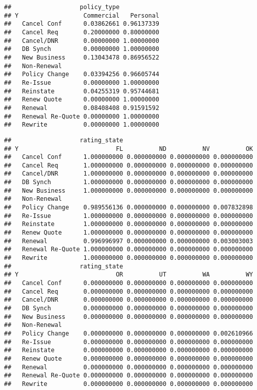 \documentclass[]{article}
\begin{document}
\begin{verbatim}
##                   policy_type
## Y                  Commercial   Personal
##   Cancel Conf      0.03862661 0.96137339
##   Cancel Req       0.20000000 0.80000000
##   Cancel/DNR       0.00000000 1.00000000
##   DB Synch         0.00000000 1.00000000
##   New Business     0.13043478 0.86956522
##   Non-Renewal                           
##   Policy Change    0.03394256 0.96605744
##   Re-Issue         0.00000000 1.00000000
##   Reinstate        0.04255319 0.95744681
##   Renew Quote      0.00000000 1.00000000
##   Renewal          0.08408408 0.91591592
##   Renewal Re-Quote 0.00000000 1.00000000
##   Rewrite          0.00000000 1.00000000
\end{verbatim}

\begin{verbatim}
##                   rating_state
## Y                           FL          ND          NV          OK
##   Cancel Conf      1.000000000 0.000000000 0.000000000 0.000000000
##   Cancel Req       1.000000000 0.000000000 0.000000000 0.000000000
##   Cancel/DNR       1.000000000 0.000000000 0.000000000 0.000000000
##   DB Synch         1.000000000 0.000000000 0.000000000 0.000000000
##   New Business     1.000000000 0.000000000 0.000000000 0.000000000
##   Non-Renewal                                                     
##   Policy Change    0.989556136 0.000000000 0.000000000 0.007832898
##   Re-Issue         1.000000000 0.000000000 0.000000000 0.000000000
##   Reinstate        1.000000000 0.000000000 0.000000000 0.000000000
##   Renew Quote      1.000000000 0.000000000 0.000000000 0.000000000
##   Renewal          0.996996997 0.000000000 0.000000000 0.003003003
##   Renewal Re-Quote 1.000000000 0.000000000 0.000000000 0.000000000
##   Rewrite          1.000000000 0.000000000 0.000000000 0.000000000
##                   rating_state
## Y                           OR          UT          WA          WY
##   Cancel Conf      0.000000000 0.000000000 0.000000000 0.000000000
##   Cancel Req       0.000000000 0.000000000 0.000000000 0.000000000
##   Cancel/DNR       0.000000000 0.000000000 0.000000000 0.000000000
##   DB Synch         0.000000000 0.000000000 0.000000000 0.000000000
##   New Business     0.000000000 0.000000000 0.000000000 0.000000000
##   Non-Renewal                                                     
##   Policy Change    0.000000000 0.000000000 0.000000000 0.002610966
##   Re-Issue         0.000000000 0.000000000 0.000000000 0.000000000
##   Reinstate        0.000000000 0.000000000 0.000000000 0.000000000
##   Renew Quote      0.000000000 0.000000000 0.000000000 0.000000000
##   Renewal          0.000000000 0.000000000 0.000000000 0.000000000
##   Renewal Re-Quote 0.000000000 0.000000000 0.000000000 0.000000000
##   Rewrite          0.000000000 0.000000000 0.000000000 0.000000000
\end{verbatim}
\end{document}

